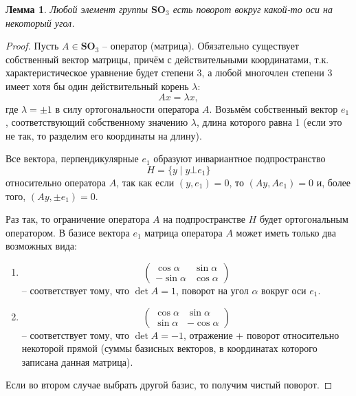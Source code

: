 \documentclass{article}
\newtheorem{lemma}{Лемма}[section]
\begin{document}
\begin{lemma}
    Любой элемент группы $\mathbf{SO}_3$ есть поворот вокруг какой-то оси на некоторый угол.
\end{lemma}
\begin{proof}
    Пусть $A \in \mathbf{SO}_3$ -- оператор (матрица). Обязательно существует собственный вектор матрицы, причём с действительными координатами, т.к. характеристическое уравнение будет степени 3, а любой многочлен степени 3 имеет хотя бы один действительный корень $\lambda$: $$ Ax = \lambda x, $$ где $\lambda = \pm 1$ в силу ортогональности оператора $A$. Возьмём собственный вектор $e_1$, соответствующий собственному значению $\lambda$, длина которого равна 1 (если это не так, то разделим его координаты на длину).
    
    Все вектора, перпендикулярные $e_1$ образуют инвариантное подпространство  $$H = \{ y \mid y \bot e_1 \}$$ относительно оператора $A$, так как если $(y, e_1) = 0$, то $(A y, A e_1) = 0$ и, более того, $(Ay, \pm e_1) = 0$.

    Раз так, то ограничение оператора $A$ на подпространстве $H$ будет ортогональным оператором. В базисе вектора $e_1$ матрица оператора $A$ может иметь только два возможных вида:
    \begin{enumerate}
        \item \[
                \begin{pmatrix}
                    \cos \alpha & \sin \alpha \\
                    -\sin \alpha & \cos \alpha
                \end{pmatrix}
            \] -- соответствует тому, что $\det A = 1$, поворот на угол $\alpha$ вокруг оси $e_1$.
        \item \[
            \begin{pmatrix}
                \cos \alpha & \sin \alpha \\
                \sin \alpha & -\cos \alpha
            \end{pmatrix}
        \] -- соответствует тому, что $\det A = -1$, отражение + поворот относительно некоторой прямой (суммы базисных векторов, в координатах которого записана данная матрица).
    \end{enumerate}
    Если во втором случае выбрать другой базис, то получим чистый поворот.
\end{proof}
\end{document}
